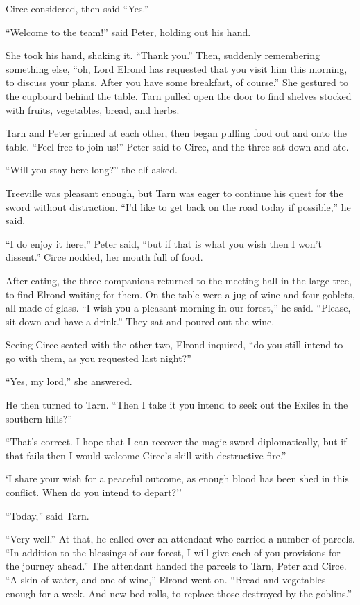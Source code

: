 Circe considered, then said ``Yes.''

``Welcome to the team!'' said Peter, holding out his hand.

She took his hand, shaking it.  ``Thank you.'' Then, suddenly remembering something else, ``oh, Lord Elrond has requested that you visit him this morning, to discuss your plans.  After you have some breakfast, of course.''  She gestured to the cupboard behind the table.  Tarn pulled open the door to find shelves stocked with fruits, vegetables, bread, and herbs.

Tarn and Peter grinned at each other, then began pulling food out and onto the table.  ``Feel free to join us!'' Peter said to Circe, and the three sat down and ate.

``Will you stay here long?'' the elf asked.

Treeville was pleasant enough, but Tarn was eager to continue his quest for the sword without distraction. ``I'd like to get back on the road today if possible,'' he said.

``I do enjoy it here,'' Peter said, ``but if that is what you wish then I won't dissent.''  Circe nodded, her mouth full of food.

After eating, the three companions returned to the meeting hall in the large tree, to find Elrond waiting for them.  On the table were a jug of wine and four goblets, all made of glass.  ``I wish you a pleasant morning in our forest,'' he said.  ``Please, sit down and have a drink.''  They sat and poured out the wine.

Seeing Circe seated with the other two, Elrond inquired, ``do you still intend to go with them, as you requested last night?''

``Yes, my lord,'' she answered.

He then turned to Tarn.  ``Then I take it you intend to seek out the Exiles in the southern hills?''

``That's correct.  I hope that I can recover the magic sword diplomatically, but if that fails then I would welcome Circe's skill with destructive fire.''

`I share your wish for a peaceful outcome, as enough blood has been shed in this conflict.  When do you intend to depart?''

``Today,'' said Tarn.

``Very well.''  At that, he called over an attendant who carried a number of parcels.  ``In addition to the blessings of our forest, I will give each of you provisions for the journey ahead.''  The attendant handed the parcels to Tarn, Peter and Circe.  ``A skin of water, and one of wine,'' Elrond went on.  ``Bread and vegetables enough for a week.  And new bed rolls, to replace those destroyed by the goblins.''